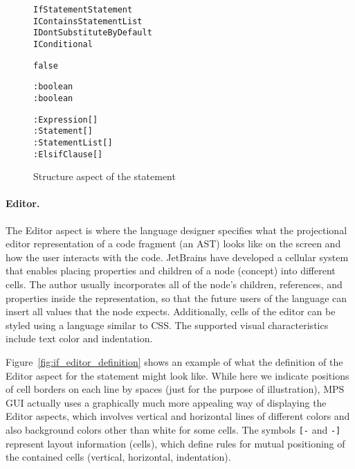 \begin{figure}[ht]
\centering
\begin{alltt}
\small
{} IfStatement  Statement
         IContainsStatementList
                   IDontSubstituteByDefault
                   IConditional

   false
   
   

     : boolean
   : boolean
  
          : Expression[]
   : Statement[]
             : StatementList[]
       : ElsifClause[]
  
\end{alltt}
\caption{Structure aspect of the  statement}
\label{fig:if_statement_structure}
\end{figure}

\paragraph{Editor.}
The Editor aspect is where the language designer specifies what the projectional editor representation of a code fragment (an AST) looks like on the screen and how the user interacts with the code.
JetBrains have developed a cellular system that enables placing properties and children of a node (concept) into different cells.
The author usually incorporates all of the node's children, references, and properties inside the representation, so that the future users of the language can insert all values that the node expects.
Additionally, cells of the editor can be styled using a language similar to CSS.
The supported visual characteristics include text color and indentation.

Figure~\ref{fig:if_editor_definition} shows an example of what the definition of the Editor aspect for the  statement might look like.
While here we indicate positions of cell borders on each line by spaces (just for the purpose of illustration), MPS GUI actually uses a graphically much more appealing way of displaying the Editor aspects, which involves vertical and horizontal lines of different colors and also background colors other than white for some cells.
The symbols \verb|[-| and \verb|-]| represent layout information (cells), which define rules for mutual positioning of the contained cells (vertical, horizontal, indentation).

